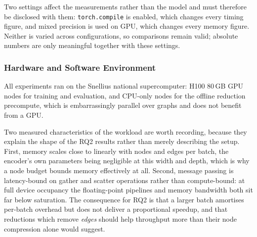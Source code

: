 Two settings affect the measurements rather than the model and must therefore be disclosed
with them: \texttt{torch.compile} is enabled, which changes every timing figure, and mixed
precision is used on GPU, which changes every memory figure. Neither is varied across
configurations, so comparisons remain valid; absolute numbers are only meaningful together
with these settings.


\subsubsection{Hardware and Software Environment}
\label{sec:method:experiment:hardware}
All experiments ran on the Snellius national supercomputer: H100 80\,GB GPU nodes for
training and evaluation, and CPU-only nodes for the offline reduction precompute, which is
embarrassingly parallel over graphs and does not benefit from a GPU\@.

Two measured characteristics of the workload are worth recording, because they explain the
shape of the RQ2 results rather than merely describing the setup. First, memory scales close
to linearly with nodes and edges per batch, the encoder's own parameters being negligible at
this width and depth, which is why a node budget bounds memory effectively at all. Second,
message passing is latency-bound on gather and scatter operations rather than
compute-bound: at full device occupancy the floating-point pipelines and memory bandwidth
both sit far below saturation. The consequence for RQ2 is that a larger
batch amortises per-batch overhead but does not deliver a proportional speedup, and that
reductions which remove \emph{edges} should help throughput more than their node compression
alone would suggest.



